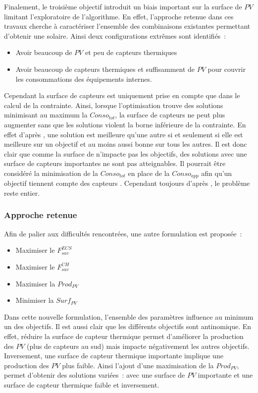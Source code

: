 Finalement, le troisième objectif introduit un biais important sur la surface de $PV$
limitant l’exploratoire de l’algorithme. En effet, l’approche retenue dans ces travaux
cherche à caractériser l’ensemble des combinaisons existantes permettant d’obtenir
une  solaire. Ainsi deux configurations extrêmes sont identifiés~:
\begin{itemize}
  \item Avoir beaucoup de $PV$ et peu de capteurs thermiques
  \item Avoir beaucoup de capteurs thermiques et suffisamment de $PV$ pour couvrir
        les consommations des équipements internes.
\end{itemize}
Cependant la surface de capteurs  est uniquement prise en compte que dans le
calcul de la contrainte. Ainsi, lorsque l’optimisation trouve des solutions minimisant au
maximum la $Conso_{tot}$, la surface de capteurs  ne peut plus augmenter sans que
les solutions violent la borne inférieure de la contrainte. En effet d’après
, une solution est meilleure qu’une autre si et seulement
si elle est meilleure sur un objectif et au moins aussi bonne sur tous les autres. Il est
donc clair que comme la surface de  n’impacte pas les objectifs, des solutions
avec une surface de capteurs  importantes ne sont pas atteignables. Il pourrait
être considéré la minimisation de la $Conso_{tot}$ en place de la $Conso_{app}$ afin qu’un
objectif tiennent compte des capteurs . Cependant toujours d’après
, le problème reste entier.


\subsubsection{Approche retenue} %
\label{ssub:approche_retenue}
\noindent Afin de palier aux difficultés rencontrées, une autre formulation est proposée~:
\begin{itemize}
  \item Maximiser le $F_{sav}^{ECS}$
  \item Maximiser le $F_{sav}^{CH}$
  \item Maximiser la $Prod_{PV}$
  \item Minimiser la $Surf_{PV}$
\end{itemize}

Dans cette nouvelle formulation, l’ensemble des paramètres influence au minimum un des
objectifs. Il est aussi clair que les différents objectifs sont antinomique.
En effet, réduire la surface de capteur thermique permet d’améliorer la production des
$PV$ (plus de capteurs au sud) mais impacte négativement les autres objectifs.
Inversement, une surface de capteur thermique importante implique une production des $PV$
plus faible. Ainsi l’ajout d’une maximisation de la $Prod_{PV}$, permet d’obtenir des
solutions variées~: avec une surface de $PV$ importante et une surface de capteur
thermique faible et inversement.


